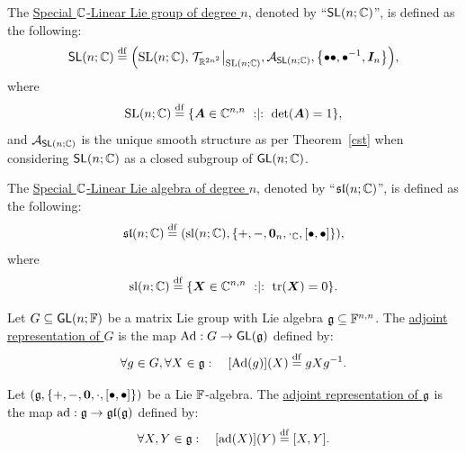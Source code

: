 \documentclass[11pt,reqno]{amsart}
\begin{document}
\begin{Def}
The \ul{Special $\mathbb{C}$-Linear Lie group of degree $n$},
denoted by ``$\operatorname{\mathsf{SL}}(n;\mathbb{C})$'', is defined as the following:
\[
\SL(n;\C)\df\Br{\SLset(n;\C),\eval{\T_{\R^{2n^2}}}_{\SLset(n;\C)},
\A_{\SL(n;\C)},\set{\bullet\bullet,\bullet\inv,\bm I_n}},
\]
where
\[
\SLset(n;\C)\df\set{\bm A\in\C^{n,n}\st\det\Br{\bm A}=1},
\]
and $\mathcal{A}_{\operatorname{\mathsf{SL}}(n;\mathbb{C})}$ is the unique smooth structure as per Theorem~\ref{cst}
when considering $\operatorname{\mathsf{SL}}(n;\mathbb{C})$ as a closed subgroup of $\operatorname{\mathsf{GL}}(n;\mathbb{C})$.
\end{Def}

\begin{Def}
The \ul{Special $\mathbb{C}$-Linear Lie algebra of degree $n$},
denoted by ``$\mathfrak{sl}(n;\mathbb{C})$'', is defined as the following:
\[
\sl(n;\C)\df\Br{\slset(n;\C),\set{+,-,\bm0_n,\cdot_\C,\SqBr{\bullet,\bullet}}},
\]
where
\[
\slset(n;\C)\df\set{\bm X\in\C^{n,n}\st\tr\Br{\bm X}=0}.
\]
\end{Def}


\begin{Def}\label{def:adjoint-group}
Let $G\subseteq\operatorname{\mathsf{GL}}(n;\mathbb{F})$ be a matrix Lie group with Lie algebra
$\mathfrak{g}\subseteq\mathbb{F}^{n,n}$.
The \ul{adjoint representation of $G$} is the map
$\operatorname{Ad}:G\to\operatorname{\mathsf{GL}}(\mathfrak{g})$ defined by:
\[
\forall g\in G,\forall X\in\g:\quad
\FUNC{\operatorname{Ad}(g)}{X}\df g X g\inv.
\]
\end{Def}

\begin{Def}\label{def:adjoint-algebra}
Let $\Br{\g,\set{+,-,\bm0,\cdot,\SqBr{\bullet,\bullet}}}$ be a Lie $\mathbb{F}$-algebra.
The \ul{adjoint representation of $\mathfrak{g}$} is the map
$\operatorname{ad}:\mathfrak{g}\to\mathfrak{gl}(\mathfrak{g})$ defined by:
\[
\forall X,Y\in\g:\quad
\FUNC{\operatorname{ad}(X)}{Y}\df\SqBr{X,Y}.
\]
\end{Def}
\end{document}
